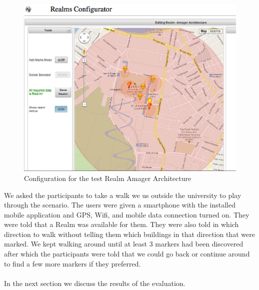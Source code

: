 \begin{figure}[ht]
	\centering
	\includegraphics[scale=0.5]{fig/amager_configuration}
	\caption{Configuration for the test Realm Amager Architecture}
	\label{fig.amager.arc}
\end{figure}

\noinden We asked the participants to take a walk we us outside the university to play through the scenario. The users were given a smartphone with the installed mobile application and GPS, Wifi, and mobile data connection turned on. They were told that a Realm was available for them. They were also told in which direction to walk without telling them which buildings in that direction that were marked. We kept walking around until at least 3 markers had been discovered after which the participants were told that we could go back or continue around to find a few more markers if they preferred.
\\\\
In the next section we discuss the results of the evaluation.

